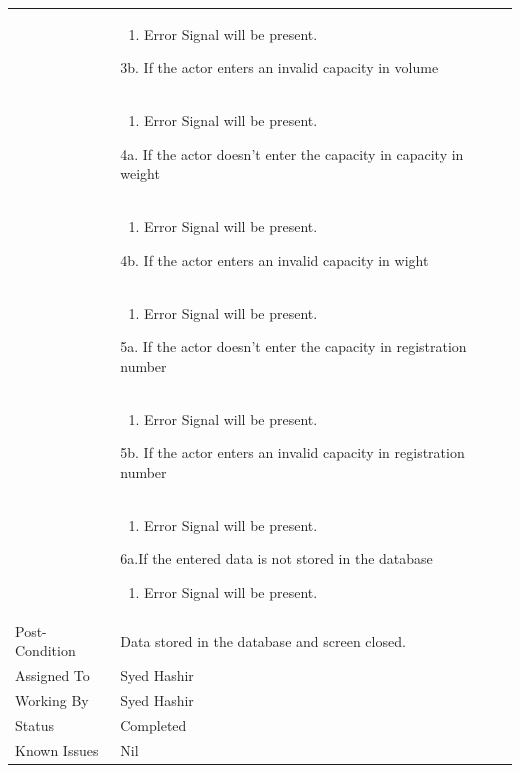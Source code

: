 \documentclass[12pt,a4paper]{article}
\begin{document}
\begin{longtable}{| p{3cm}|p{12cm}|}
&	\begin{enumerate}
		\item Error Signal will be present.
	\end{enumerate}
3b. If the actor enters an invalid capacity in volume \\ 	
&	\begin{enumerate}
		\item Error Signal will be present.
	\end{enumerate}
4a. If the actor doesn't enter the capacity in capacity in weight\\ 	
&	\begin{enumerate}
		\item Error Signal will be present.
	\end{enumerate}
4b. If the actor enters an invalid capacity in wight\\ 	
&	\begin{enumerate}
		\item Error Signal will be present.
	\end{enumerate}
5a. If the actor doesn't enter the capacity in registration number\\ 	
&	\begin{enumerate}
		\item Error Signal will be present.
	\end{enumerate}
5b. If the actor enters an invalid capacity in registration number\\ 	
&	\begin{enumerate}
		\item Error Signal will be present.
	\end{enumerate}
6a.If the entered data is not stored in the database  
	\begin{enumerate}
		\item Error Signal will be present.
	\end{enumerate}
\\ \hline
Post-Condition &  Data stored in the database and screen closed. \\\hline
Assigned To &  Syed Hashir
\\ \hline
Working By &   Syed Hashir
\\ \hline
Status & 	Completed	
\\ \hline
Known Issues & Nil
\\\hline
\end{longtable}
\end{document}
